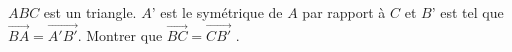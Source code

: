 
$ABC$ est un triangle. $A’$ est le symétrique de $A$ par rapport à $C$ et $B’$ est tel que  $\overrightarrow{BA}=\overrightarrow{A'B'}$. Montrer que  $\overrightarrow{BC}=\overrightarrow{CB'}$ . 

%
%
%
%


